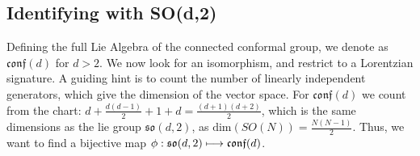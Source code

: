 \documentclass{article}
\begin{document}
\subsection{Identifying with SO(d,2)}
Defining the full Lie Algebra of the connected conformal group, we denote as $\mathfrak{conf}(d)$ for $d>2$. We now look for an isomorphism, and restrict to a Lorentzian signature.  A guiding hint is to count the number of linearly independent generators, which give the dimension of the vector space. For $\mathfrak{conf}(d)$ we count from the chart: $d + \frac{d(d-1)}{2}+1+d = \frac{(d+1)(d+2)}{2}$, which is the same dimensions as the lie group $\mathfrak{so}(d,2)$, as $\text{dim}\left(SO(N)\right) = \frac{N(N-1)}{2}$. Thus, we want to find a bijective map $\phi : \space \mathfrak{so}(d,2) \longmapsto \mathfrak{conf}(d)$.
\end{document}
